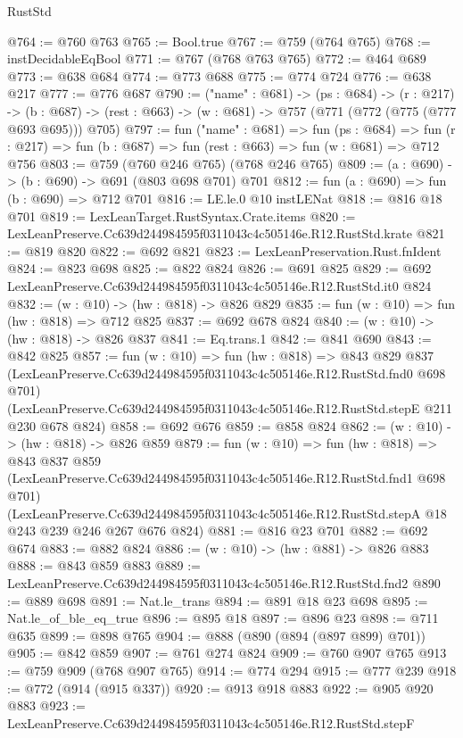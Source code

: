 \begin{lexlean}{RustStd}
\begin{coremodule}
@764 := @760 @763
@765 := Bool.true
@767 := @759 (@764 @765)
@768 := instDecidableEqBool
@771 := @767 (@768 @763 @765)
@772 := @464 @689
@773 := @638 @684
@774 := @773 @688
@775 := @774 @724
@776 := @638 @217
@777 := @776 @687
@790 := ("name" : @681) ->
  (ps : @684) ->
  (r : @217) ->
  (b : @687) -> (rest : @663) -> (w : @681) -> @757 (@771 (@772 (@775 (@777 @693 @695))) @705)
@797 := fun ("name" : @681) =>
  fun (ps : @684) =>
  fun (r : @217) => fun (b : @687) => fun (rest : @663) => fun (w : @681) => @712 @756
@803 := @759 (@760 @246 @765) (@768 @246 @765)
@809 := (a : @690) -> (b : @690) -> @691 (@803 @698 @701) @701
@812 := fun (a : @690) => fun (b : @690) => @712 @701
@816 := LE.le.{0} @10 instLENat
@818 := @816 @18 @701
@819 := LexLeanTarget.RustSyntax.Crate.items
@820 := LexLeanPreserve.Cc639d244984595f0311043c4c505146e.R12.RustStd.krate
@821 := @819 @820
@822 := @692 @821
@823 := LexLeanPreservation.Rust.fnIdent
@824 := @823 @698
@825 := @822 @824
@826 := @691 @825
@829 := @692 LexLeanPreserve.Cc639d244984595f0311043c4c505146e.R12.RustStd.it0 @824
@832 := (w : @10) -> (hw : @818) -> @826 @829
@835 := fun (w : @10) => fun (hw : @818) => @712 @825
@837 := @692 @678 @824
@840 := (w : @10) -> (hw : @818) -> @826 @837
@841 := Eq.trans.{1}
@842 := @841 @690
@843 := @842 @825
@857 := fun (w : @10) =>
  fun (hw : @818) =>
  @843
    @829
    @837
    (LexLeanPreserve.Cc639d244984595f0311043c4c505146e.R12.RustStd.fnd0 @698 @701)
    (LexLeanPreserve.Cc639d244984595f0311043c4c505146e.R12.RustStd.stepE @211 @230 @678 @824)
@858 := @692 @676
@859 := @858 @824
@862 := (w : @10) -> (hw : @818) -> @826 @859
@879 := fun (w : @10) =>
  fun (hw : @818) =>
  @843
    @837
    @859
    (LexLeanPreserve.Cc639d244984595f0311043c4c505146e.R12.RustStd.fnd1 @698 @701)
    (LexLeanPreserve.Cc639d244984595f0311043c4c505146e.R12.RustStd.stepA
      @18
      @243
      @239
      @246
      @267
      @676
      @824)
@881 := @816 @23 @701
@882 := @692 @674
@883 := @882 @824
@886 := (w : @10) -> (hw : @881) -> @826 @883
@888 := @843 @859 @883
@889 := LexLeanPreserve.Cc639d244984595f0311043c4c505146e.R12.RustStd.fnd2
@890 := @889 @698
@891 := Nat.le_trans
@894 := @891 @18 @23 @698
@895 := Nat.le_of_ble_eq_true
@896 := @895 @18
@897 := @896 @23
@898 := @711 @635
@899 := @898 @765
@904 := @888 (@890 (@894 (@897 @899) @701))
@905 := @842 @859
@907 := @761 @274 @824
@909 := @760 @907 @765
@913 := @759 @909 (@768 @907 @765)
@914 := @774 @294
@915 := @777 @239
@918 := @772 (@914 (@915 @337))
@920 := @913 @918 @883
@922 := @905 @920 @883
@923 := LexLeanPreserve.Cc639d244984595f0311043c4c505146e.R12.RustStd.stepF

\end{coremodule}
\end{lexlean}
